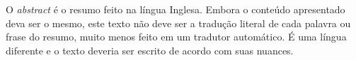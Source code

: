 O \emph{abstract} é o resumo feito na língua Inglesa. Embora o conteúdo apresentado
deva ser o mesmo, este texto não deve ser a tradução literal de cada palavra ou 
frase do resumo, muito menos feito em um tradutor automático. É uma língua 
diferente e o texto deveria ser escrito de acordo com suas nuances.
